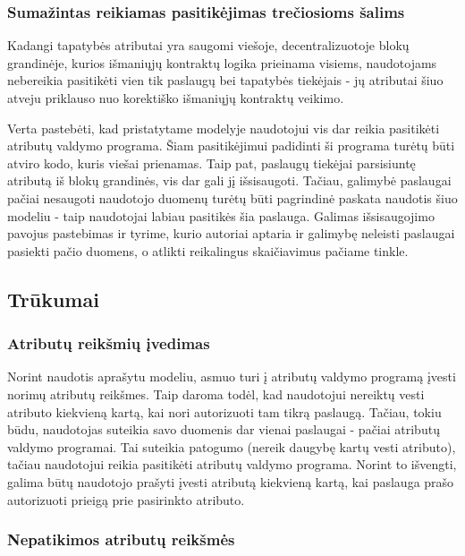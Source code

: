 \subsubsection{Sumažintas reikiamas pasitikėjimas trečiosioms šalims}

Kadangi tapatybės atributai yra saugomi viešoje, decentralizuotoje blokų grandinėje, kurios išmaniųjų kontraktų
logika prieinama visiems, naudotojams nebereikia pasitikėti vien tik paslaugų bei tapatybės tiekėjais - jų
atributai šiuo atveju priklauso nuo korektiško išmaniųjų kontraktų veikimo.

Verta pastebėti, kad pristatytame modelyje naudotojui vis dar reikia pasitikėti atributų valdymo programa. Šiam pasitikėjimui
padidinti ši programa turėtų būti atviro kodo, kuris viešai prienamas. Taip pat, paslaugų tiekėjai parsisiuntę atributą
iš blokų grandinės, vis dar gali jį išsisaugoti. Tačiau, galimybė paslaugai pačiai nesaugoti naudotojo duomenų turėtų būti pagrindinė paskata
naudotis šiuo modeliu - taip naudotojai labiau pasitikės šia paslauga. Galimas išsisaugojimo pavojus pastebimas ir
\cite{MITPaper} tyrime, kurio autoriai aptaria ir galimybę neleisti paslaugai pasiekti pačio duomens, o atlikti
reikalingus skaičiavimus pačiame tinkle.

\subsection{Trūkumai}

\subsubsection{Atributų reikšmių įvedimas}

Norint naudotis aprašytu modeliu, asmuo turi į atributų valdymo programą įvesti norimų atributų reikšmes. Taip daroma todėl,
kad naudotojui nereiktų vesti atributo kiekvieną kartą, kai nori autorizuoti tam tikrą paslaugą. Tačiau, tokiu būdu,
naudotojas suteikia savo duomenis dar vienai paslaugai - pačiai atributų valdymo programai. Tai suteikia patogumo (nereik
daugybę kartų vesti atributo), tačiau naudotojui reikia pasitikėti atributų valdymo programa. Norint to išvengti,
galima būtų naudotojo prašyti įvesti atributą kiekvieną kartą, kai paslauga prašo autorizuoti prieigą prie pasirinkto atributo.

\subsubsection{Nepatikimos atributų reikšmės}


